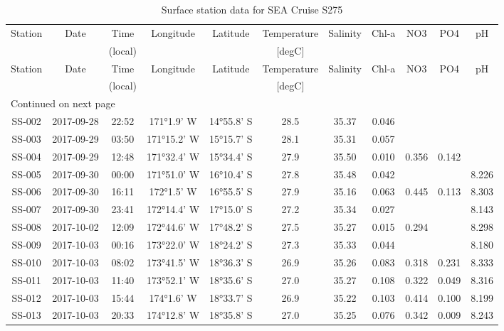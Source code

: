 \begin{longtable}{ccccccccccc}
\caption{\label{surfsamp} Surface station data for SEA Cruise S275} \\ 
 Station & Date & Time & Longitude & Latitude & Temperature & Salinity & Chl-a & NO3 & PO4 & pH \\ 
   &  & (local) &  &  & [degC] &  \\ 
\hline\n\endfirsthead
Station & Date & Time & Longitude & Latitude & Temperature & Salinity & Chl-a & NO3 & PO4 & pH \\ 
 &  & (local) &  &  & [degC] &  \\ 
\hline
\endhead
\hline
\multicolumn{11}{l}{\footnotesize Continued on next page}
\endfoot
\endlastfoot
 \hline
SS-001 & 2017-09-28 & 18:41 & 170°49.6' W & 14°34.6' S & 28.6 & 35.42 & 0.044 & 0.727 & 0.135 &  \\ 
  SS-002 & 2017-09-28 & 22:52 & 171°1.9' W & 14°55.8' S & 28.5 & 35.37 & 0.046 &  &  &  \\ 
  SS-003 & 2017-09-29 & 03:50 & 171°15.2' W & 15°15.7' S & 28.1 & 35.31 & 0.057 &  &  &  \\ 
  SS-004 & 2017-09-29 & 12:48 & 171°32.4' W & 15°34.4' S & 27.9 & 35.50 & 0.010 & 0.356 & 0.142 &  \\ 
  SS-005 & 2017-09-30 & 00:00 & 171°51.0' W & 16°10.4' S & 27.8 & 35.48 & 0.042 &  &  & 8.226 \\ 
  SS-006 & 2017-09-30 & 16:11 & 172°1.5' W & 16°55.5' S & 27.9 & 35.16 & 0.063 & 0.445 & 0.113 & 8.303 \\ 
  SS-007 & 2017-09-30 & 23:41 & 172°14.4' W & 17°15.0' S & 27.2 & 35.34 & 0.027 &  &  & 8.143 \\ 
  SS-008 & 2017-10-02 & 12:09 & 172°44.6' W & 17°48.2' S & 27.5 & 35.27 & 0.015 & 0.294 &  & 8.298 \\ 
  SS-009 & 2017-10-03 & 00:16 & 173°22.0' W & 18°24.2' S & 27.3 & 35.33 & 0.044 &  &  & 8.180 \\ 
  SS-010 & 2017-10-03 & 08:02 & 173°41.5' W & 18°36.3' S & 26.9 & 35.26 & 0.083 & 0.318 & 0.231 & 8.333 \\ 
  SS-011 & 2017-10-03 & 11:40 & 173°52.1' W & 18°35.6' S & 27.0 & 35.27 & 0.108 & 0.322 & 0.049 & 8.316 \\ 
  SS-012 & 2017-10-03 & 15:44 & 174°1.6' W & 18°33.7' S & 26.9 & 35.22 & 0.103 & 0.414 & 0.100 & 8.199 \\ 
  SS-013 & 2017-10-03 & 20:33 & 174°12.8' W & 18°35.8' S & 27.0 & 35.25 & 0.076 & 0.342 & 0.009 & 8.243 \\ 

\end{longtable}
